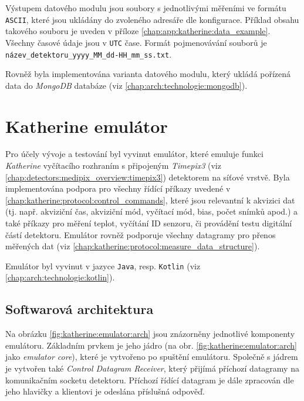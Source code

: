 Výstupem datového modulu jsou soubory s jednotlivými měřeními ve formátu \texttt{ASCII}, které jsou ukládány do zvoleného adresáře dle konfigurace. Příklad obsahu takového souboru je uveden v příloze \ref{chap:app:katherine:data_example}. Všechny časové údaje jsou v \texttt{UTC} čase. Formát pojmenovávání souborů je \texttt{název\_detektoru\_yyyy\_MM\_dd-HH\_mm\_ss.txt}.

Rovněž byla implementována varianta datového modulu, který ukládá pořízená data do \textit{MongoDB} databáze (viz \ref{chap:arch:technologie:mongodb}).

\section{Katherine emulátor}\label{chap:katherine:emulator}
Pro účely vývoje a testování byl vyvinut emulátor, které emuluje funkci \textit{Katherine} vyčítacího rozhraním s připojeným \textit{Timepix3} (viz \ref{chap:detectors:medipix_overview:timepix3}) detektorem na síťové vrstvě. Byla implementována podpora pro všechny řídící příkazy uvedené v \ref{chap:katherine:protocol:control_commands}, které jsou relevantní k akvizici dat (tj. např. akviziční čas, akviziční mód, vyčítací mód, bias, počet snímků apod.) a také příkazy pro měření teplot, vyčítání ID senzoru, či provádění testu digitální částí detektoru. Emulátor rovněž podporuje všechny datagramy pro přenos měřených dat (viz \ref{chap:katherine:protocol:measure_data_structure}).

Emulátor byl vyvinut v jazyce \texttt{Java}, resp. \texttt{Kotlin} (viz \ref{chap:arch:technologie:kotlin}).

\subsection{Softwarová architektura}
Na obrázku \ref{fig:katherine:emulator:arch} jsou znázorněny jednotlivé komponenty emulátoru. Základním prvkem je jeho jádro (na obr. \ref{fig:katherine:emulator:arch} jako \textit{emulator core}), které je vytvořeno po spuštění emulátoru. Společně s jádrem je vytvořen také \textit{Control Datagram Receiver}, který přijímá příchozí datagramy na komunikačním socketu detektoru. Příchozí řídící datagram je dále zpracován dle jeho hlavičky a klientovi je odeslána příslušná odpověď.

